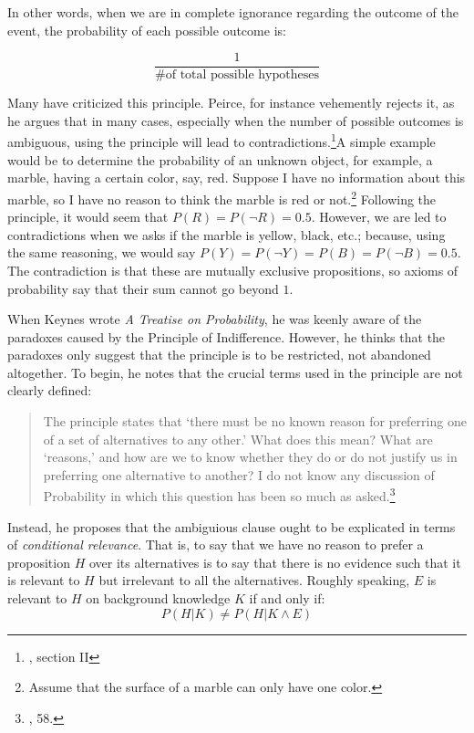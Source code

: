 In other words, when we are in complete ignorance regarding the outcome
of the event, the probability of each possible outcome is:

$$\frac{1}{\text{\# of total possible hypotheses}}$$

Many have criticized this principle. Peirce, for instance vehemently
rejects it, as he argues that in many cases, especially when the number
of possible outcomes is ambiguous, using the principle will lead to
contradictions.\footnote{\cite{probabilityofinduction}, section II}A simple example would be to determine the probability of an unknown object, for example, a marble, having a certain color, say, red. Suppose I have no information about this marble, so I have no
reason to think the marble is red or not.\footnote{Assume that the surface
  of a marble can only have one color.} Following the principle, it would
seem that \(P(R) = P(\neg R) = 0.5\). However, we are led to
contradictions when we asks if the marble is yellow, black, etc.; because,
using the same reasoning, we would say
\(P(Y) = P(\neg Y) = P(B) = P(\neg B) = 0.5\). The contradiction is that
these are mutually exclusive propositions, so axioms of probability say
that their sum cannot go beyond \(1\).

When Keynes wrote \emph{A Treatise on Probability}, he was keenly aware
of the paradoxes caused by the Principle of Indifference. However, he
thinks that the paradoxes only suggest that the principle is to be
restricted, not abandoned altogether. To begin, he notes that the
crucial terms used in the principle are not clearly defined:

\begin{quote}
The principle states that `there must be no known reason for preferring
one of a set of alternatives to any other.' What does this mean? What
are `reasons,' and how are we to know whether they do or do not justify
us in preferring one alternative to another? I do not know any
discussion of Probability in which this question has been so much as
asked.\footnote{\cite{keynes}, 58.}
\end{quote}

Instead, he proposes that the ambiguious clause ought to be explicated in terms of
\emph{conditional relevance}. That is, to say that we have no reason to prefer
a proposition \(H\) over its alternatives is to say that there is no
evidence such that it is relevant to \(H\) but irrelevant to all the
alternatives. Roughly speaking, \(E\) is relevant to \(H\) on background
knowledge \(K\) if and only if: \[P(H|K) \neq P(H|K\wedge E)\]

